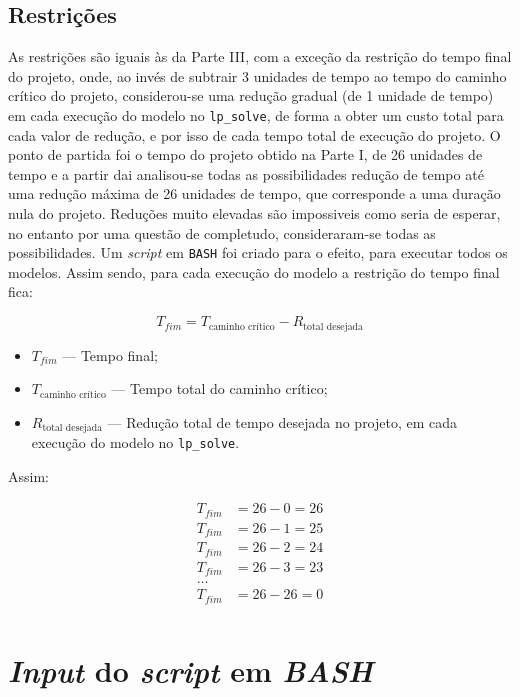 \subsection{Restrições}

As restrições são iguais às da Parte III, com a exceção da restrição do
tempo final do projeto, onde, ao invés de subtrair 3 unidades de tempo ao tempo
do caminho crítico do projeto, considerou-se uma redução gradual (de 1 unidade de tempo) em cada
execução do modelo no \texttt{lp\_solve}, de forma a obter um custo total para
cada valor de redução, e por isso de cada tempo total de execução do projeto. O ponto de partida foi o tempo do projeto obtido na Parte I, de 26 unidades de tempo e a partir dai analisou-se todas as possibilidades redução de tempo até uma redução máxima de 26 unidades de tempo, que corresponde a uma duração nula do projeto. Reduções muito elevadas são impossiveis como seria de esperar, no entanto por uma questão de completudo, consideraram-se todas as possibilidades. Um
\emph{script} em \texttt{BASH} foi criado para o efeito, para executar todos os
modelos. Assim sendo, para cada execução do modelo a restrição do tempo final
fica:

$$ T_{fim} = T_{\text{caminho crítico}} - R_{\text{total desejada}}$$


\begin{itemize} 
	
	\item $T_{fim}$ --- Tempo final;
	\item $T_{\text{caminho crítico}}$ --- Tempo total do caminho crítico;
	\item $R_{\text{total desejada}}$ --- Redução total de tempo desejada no projeto,
		em cada execução do modelo no \texttt{lp\_solve}.

\end{itemize}

Assim:

\begin{align*}	
	 T_{fim}& = 26 - 0 = 26\\
	 T_{fim}& = 26 - 1 = 25\\
	 T_{fim}& = 26 - 2 = 24\\
	 T_{fim}& = 26 - 3 = 23\\
	  \dots     & \\
	 T_{fim}& = 26 - 26 = 0\\
\end{align*}

\section{\emph{Input} do \emph{script} em \emph{BASH}}

